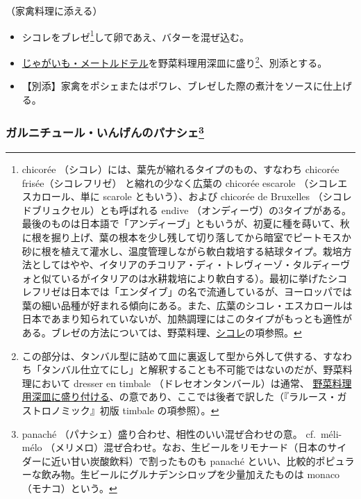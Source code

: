 \begin{recette}


（家禽料理に添える）

\begin{itemize}
\item
  シコレをブレゼ\footnote{chicorée
    （シコレ）には、葉先が縮れるタイプのもの、すなわち chicorée
    frisée（シコレフリゼ） と縮れの少なく広葉の chicorée escarole
    （シコレエスカロール、単に scarole ともいう）、および chicorée de
    Bruxelles （シコレドブリュクセル）とも呼ばれる endive
    （オンディーヴ）の3タイプがある。最後のものは日本語で「アンディーブ」ともいうが、初夏に種を蒔いて、秋に根を掘り上げ、葉の根本を少し残して切り落してから暗室でピートモスか砂に根を植えて灌水し、温度管理しながら軟白栽培する結球タイプ。栽培方法としてはやや、イタリアのチコリア・ディ・トレヴィーゾ・タルディーヴォと似ているがイタリアのは水耕栽培により軟白する）。最初に挙げたシコレフリゼは日本では「エンダイブ」の名で流通しているが、ヨーロッパでは葉の細い品種が好まれる傾向にある。また、広葉のシコレ・エスカロールは日本であまり知られていないが、加熱調理にはこのタイプがもっとも適性がある。ブレゼの方法については、野菜料理、\protect\hyperlink{chicoree}{シコレ}の項参照。}して卵であえ、バターを混ぜ込む。
\item
  \protect\hyperlink{pommes-de-terre-a-la-maitre-d-hotel}{じゃがいも・メートルドテル}を野菜料理用深皿に盛り\footnote{この部分は、タンバル型に詰めて皿に裏返して型から外して供する、すなわち「タンバル仕立てにし」と解釈することも不可能ではないのだが、野菜料理において
    dresser en timbale （ドレセオンタンバール）は通常、
    \ul{野菜料理用深皿に盛り付ける}、の意であり、ここでは後者で訳した（『ラルース・ガストロノミック』初版
    timbale の項参照）。}、別添とする。
\item
  【別添】家禽をポシェまたはポワレ、ブレゼした際の煮汁をソースに仕上げる。
\end{itemize}

\atoaki{}

\hypertarget{garniture-de-haricots-panaches}{%
\subsubsection[ガルニチュール・いんげんのパナシェ]{\texorpdfstring{ガルニチュール・いんげんのパナシェ\footnote{panaché
  （パナシェ）盛り合わせ、相性のいい混ぜ合わせの意。 cf.~méli-mélo
  （メリメロ）混ぜ合わせ。なお、生ビールをリモナード（日本のサイダーに近い甘い炭酸飲料）で割ったものも
  panaché
  といい、比較的ポピュラーな飲み物。生ビールにグルナデンシロップを少量加えたものは
  monaco （モナコ）という。}}{ガルニチュール・いんげんのパナシェ}}\label{garniture-de-haricots-panaches}}


\end{recette}
